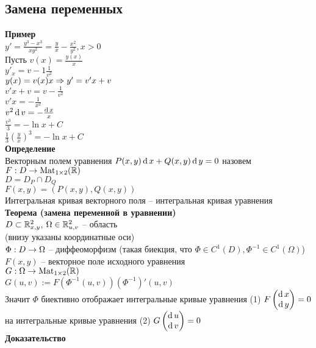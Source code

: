 \documentclass[12pt]{article}
\begin{document}
\subsection{Замена переменных}
\textbf{Пример}\\
$y' = \frac{y^3-x^3}{xy^2} = \frac yx - \frac{x^2}{y^2}, x > 0$\\
Пусть $v(x) = \frac {y(x)}x$\\
$y'_x = v - 1\frac 1{v^2}$\\
$y(x) = v(x)x \Rightarrow y' = v'x + v$\\
$v'x + v = v - \frac1{v^2}$\\
$v'x = -\frac1{x^2}$\\
$v^2 \operatorname{d} v = - \frac{\operatorname{d} x}x$\\
$\frac{v^3}3 = -\ln x + C$\\
$\frac13(\frac yx)^3 = -\ln x + C$\\
\textbf{Определение}\\
Векторным полем уравнения $P(x,y)\operatorname{d} x + Q(x,y) \operatorname{d} y = 0$ назовем $F: D \rightarrow \operatorname{Mat}_{1\times 2}(\mathbb{R})$\\
$D = D_P \cap D_Q$\\
$F(x, y) = (P(x,y), Q(x, y))$\\
Интегральная кривая векторного поля -- интегральная кривая уравнения\\
\textbf{Теорема (замена переменной в уравнении)}\\
$D \subset \mathbb{R}^2_{x, y}$, $\Omega \in \mathbb{R}^2_{u,v}$ -- область\\
(внизу указаны координатные оси)\\
$\Phi: D \rightarrow \Omega$ -- диффеоморфизм (такая биекция, что $\Phi \in C^1(D), \Phi^{-1} \in C^1(\Omega)$)\\
$F(x,y)$ -- векторное поле исходного уравнения\\
$G: \Omega \rightarrow \operatorname{Mat}_{1\times 2}(\mathbb{R})$\\
$G(u, v) := F(\Phi^{-1}(u,v))(\Phi^{-1})'(u, v)$\\
Значит $\Phi$ биективно отображает интегральные кривые уравнения (1) $F\begin{pmatrix}
    \operatorname{d} x\\\operatorname{d} y
\end{pmatrix} = 0$ на интегральные кривые уравнения (2) $G\begin{pmatrix}
    \operatorname{d} u\\\operatorname{d} v
\end{pmatrix} = 0$\\
\textbf{Доказательство}\\
\end{document}
